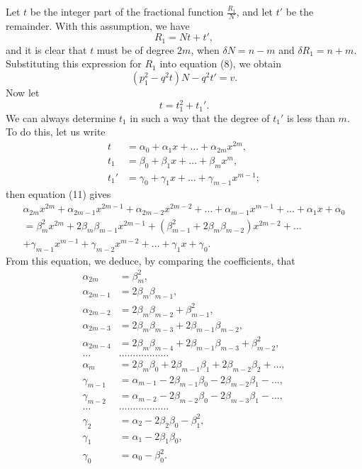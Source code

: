\documentclass[oneside, 12 pt, leqno]{memoir}
\begin{document}
Let \(t\) be the integer part of the fractional function \(\frac{R_1}{N}\), and let \(t'\) be the remainder. With this assumption, we have
\[\tag{9}R_1=N t+t',\]
and it is clear that \(t\) must be of degree \(2 m\), when \(\delta N=n-m\) and \(\delta R_1=n+m\). Substituting this expression for \(R_1\) into equation (8), we obtain
\[\tag{10}\left(p_1^2-q^2 t\right) N-q^2 t'=v.\]
%
Now let
\[\tag{11}t=t_1^2+{t_1}'.\]
We can always determine \(t_1\) in such a way that the degree of \(t_1'\) is less than \(m\). To do this, let us write
\[
\begin{aligned}
t&=\alpha_0+\alpha_1 x+\dots+\alpha_{2m} x^{2m}, \\
t_1&=\beta_0+\beta_1 x+\dots+\beta_m x^m, \\
t_1'&=\gamma_0+\gamma_1 x+\dots+\gamma_{m-1} x^{m-1};
\end{aligned}
\]
then equation (11) gives
\[
\begin{gathered}
\alpha_{2m} x^{2m}+\alpha_{2m-1} x^{2m-1}+\alpha_{2m-2} x^{2m-2}+\dots+\alpha_{m-1} x^{m-1}+\dots+\alpha_1 x+\alpha_0 \\
=\beta_m^2 x^{2m}+2\beta_m\beta_{m-1} x^{2m-1}+(\beta_{m-1}^2+2\beta_m\beta_{m-2}) x^{2m-2}+\dots \\
+\gamma_{m-1} x^{m-1}+\gamma_{m-2} x^{m-2}+\dots+\gamma_1 x+\gamma_0.
\end{gathered}
\]
From this equation, we deduce, by comparing the coefficients, that
\[
\begin{aligned}
\alpha_{2m}&=\beta_m^2, \\
\alpha_{2m-1}&=2\beta_m\beta_{m-1}, \\
\alpha_{2m-2}&=2\beta_m\beta_{m-2}+\beta_{m-1}^2, \\
\alpha_{2m-3}&=2\beta_m\beta_{m-3}+2\beta_{m-1}\beta_{m-2}, \\
\alpha_{2m-4}&=2\beta_m\beta_{m-4}+2\beta_{m-1}\beta_{m-3}+\beta_{m-2}^2, \\
\dots&\dots\dots\dots\dots\dots\dots \\
\alpha_m&=2\beta_m\beta_0+2\beta_{m-1}\beta_1+2\beta_{m-2}\beta_2+\dots, \\
\gamma_{m-1}&=\alpha_{m-1}-2\beta_{m-1}\beta_0-2\beta_{m-2}\beta_1-\dots, \\
\gamma_{m-2}&=\alpha_{m-2}-2\beta_{m-2}\beta_0-2\beta_{m-3}\beta_1-\dots, \\
\dots&\dots\dots\dots\dots\dots\dots \\
\gamma_2&=\alpha_2-2\beta_2\beta_0-\beta_1^2, \\
\gamma_1&=\alpha_1-2\beta_1\beta_0, \\
\gamma_0&=\alpha_0-\beta_0^2.
\end{aligned}
\]
\end{document}
